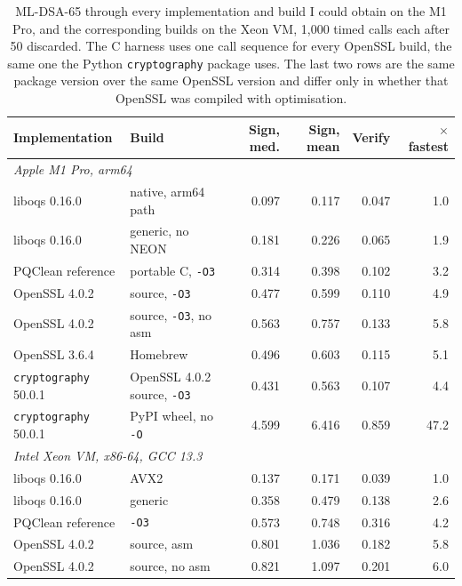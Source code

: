 \begin{table}[t]
\caption{ML-DSA-65 through every implementation and build I could obtain on the M1 Pro, and the corresponding builds on the Xeon VM, 1,000 timed calls each after 50 discarded. The C harness uses one call sequence for every OpenSSL build, the same one the Python \texttt{cryptography} package uses. The last two rows are the same package version over the same OpenSSL version and differ only in whether that OpenSSL was compiled with optimisation.}
\label{tab:impls}
\small
\setlength{\tabcolsep}{4.5pt}
\begin{tabular}{llrrrr}
\toprule
Implementation & Build & Sign, med. & Sign, mean & Verify & $\times$ fastest\\
\midrule
\multicolumn{6}{l}{\emph{Apple M1 Pro, arm64}}\\
liboqs 0.16.0 & native, arm64 path & 0.097 & 0.117 & 0.047 & 1.0\\
liboqs 0.16.0 & generic, no NEON & 0.181 & 0.226 & 0.065 & 1.9\\
PQClean reference & portable C, \texttt{-O3} & 0.314 & 0.398 & 0.102 & 3.2\\
OpenSSL 4.0.2 & source, \texttt{-O3} & 0.477 & 0.599 & 0.110 & 4.9\\
OpenSSL 4.0.2 & source, \texttt{-O3}, no asm & 0.563 & 0.757 & 0.133 & 5.8\\
OpenSSL 3.6.4 & Homebrew & 0.496 & 0.603 & 0.115 & 5.1\\
\texttt{cryptography} 50.0.1 & OpenSSL 4.0.2 source, \texttt{-O3} & 0.431 & 0.563 & 0.107 & 4.4\\
\texttt{cryptography} 50.0.1 & PyPI wheel, no \texttt{-O} & 4.599 & 6.416 & 0.859 & 47.2\\
\midrule
\multicolumn{6}{l}{\emph{Intel Xeon VM, x86-64, GCC 13.3}}\\
liboqs 0.16.0 & AVX2 & 0.137 & 0.171 & 0.039 & 1.0\\
liboqs 0.16.0 & generic & 0.358 & 0.479 & 0.138 & 2.6\\
PQClean reference & \texttt{-O3} & 0.573 & 0.748 & 0.316 & 4.2\\
OpenSSL 4.0.2 & source, asm & 0.801 & 1.036 & 0.182 & 5.8\\
OpenSSL 4.0.2 & source, no asm & 0.821 & 1.097 & 0.201 & 6.0\\
\bottomrule
\end{tabular}
\end{table}
